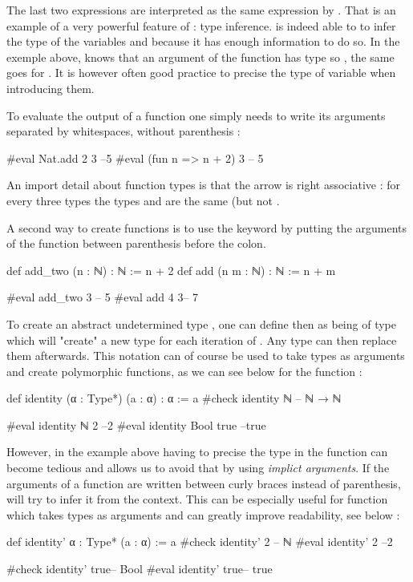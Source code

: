 The last two expressions are interpreted as the same expression by \Lean. That is an example of a very powerful feature of \Lean : type inference. \Lean is indeed able to to infer the type of the variables  and  because it has enough information to do so. In the exemple above, \Lean knows that an argument of the function  has type  so , the same goes for . It is however often good practice to precise the type of variable when introducing them. 

To evaluate the output of a function one simply needs to write its arguments separated by whitespaces, without parenthesis :
\begin{leancode}
#eval Nat.add 2 3 --5
#eval (fun n => n + 2) 3 -- 5
\end{leancode}

An import detail about function types is that the arrow \lean{\to} is right associative : for every three types  the types  and  are the same (but not .

A second way to create functions is to use the  keyword by putting the arguments of the function between parenthesis before the colon.

\begin{leancode}
def add_two (n : ℕ) : ℕ := n + 2
def add (n m : ℕ) : ℕ := n + m

#eval add_two 3 -- 5
#eval add 4 3-- 7
\end{leancode}

To create an abstract undetermined type , one can define then as being of type  which will "create" a new type for each iteration of . Any type can then replace them afterwards.
This notation can of course be used to take types as arguments and create polymorphic functions, as we can see below for the  function :
\begin{leancode}
def identity (α : Type*) (a : α) : α := a
#check identity ℕ -- ℕ → ℕ

#eval identity ℕ 2 --2
#eval identity Bool true --true 
\end{leancode}

However, in the example above having to precise the type  in the  function can become tedious and \Lean allows us to avoid that by using \emph{implict arguments}. If the arguments of a function are written between curly braces instead of parenthesis, \Lean will try to infer it from the context.
 This can be especially useful for function which takes types as arguments and can greatly improve readability, see below :
\begin{leancode}
def identity' {α : Type*}  (a : α) := a
#check identity' 2 -- ℕ 
#eval identity' 2 --2

#check identity' true-- Bool
#eval identity' true-- true
\end{leancode}

